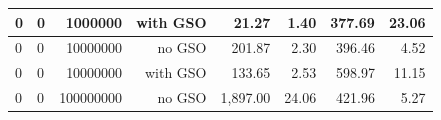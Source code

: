 \documentclass[12pt,a4paper,twoside,openright]{report}
\begin{document}
\begin{table}[H]
\begin{tabular}{|l|l|r|r|r|r|r|r|}
0                                                                                          & 0                                                                                             & 1000000                                                                                        & with GSO                                                                      & 21.27                                                                                           & 1.40                                                                                                          & 377.69                                                                                        & 23.06                                                                                                       \\ \hline
0                                                                                          & 0                                                                                             & 10000000                                                                                       & no GSO                                                                        & 201.87                                                                                          & 2.30                                                                                                          & 396.46                                                                                        & 4.52                                                                                                        \\ \hline
0                                                                                          & 0                                                                                             & 10000000                                                                                       & with GSO                                                                      & 133.65                                                                                          & 2.53                                                                                                          & 598.97                                                                                        & 11.15                                                                                                       \\ \hline
0                                                                                          & 0                                                                                             & 100000000                                                                                      & no GSO                                                                        & 1,897.00                                                                                        & 24.06                                                                                                         & 421.96                                                                                        & 5.27                                                                                                        \\ \hline

\end{tabular}
\end{table}
\end{document}
